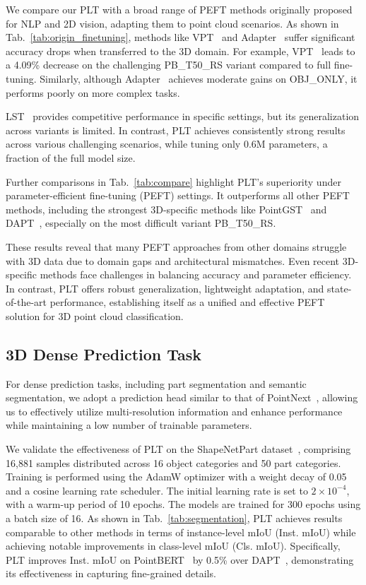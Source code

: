 We compare our PLT with a broad range of PEFT methods originally proposed for NLP and 2D vision, adapting them to point cloud scenarios. As shown in Tab.~\ref{tab:origin_finetuning}, methods like VPT~\cite{jia2022visual} and Adapter~\cite{houlsby2019parameter} suffer significant accuracy drops when transferred to the 3D domain. For example, VPT~\cite{jia2022visual} leads to a 4.09\% decrease on the challenging PB\_T50\_RS variant compared to full fine-tuning. Similarly, although Adapter~\cite{houlsby2019parameter} achieves moderate gains on OBJ\_ONLY, it performs poorly on more complex tasks.

LST~\cite{sung2022lst} provides competitive performance in specific settings, but its generalization across variants is limited. In contrast, PLT achieves consistently strong results across various challenging scenarios, while tuning only 0.6M parameters, a fraction of the full model size.

Further comparisons in Tab.~\ref{tab:compare} highlight PLT’s superiority under parameter-efficient fine-tuning (PEFT) settings. It outperforms all other PEFT methods, including the strongest 3D-specific methods like PointGST~\cite{liang2024parameter} and DAPT~\cite{zhou2024dynamic}, especially on the most difficult variant PB\_T50\_RS.

These results reveal that many PEFT approaches from other domains struggle with 3D data due to domain gaps and architectural mismatches. Even recent 3D-specific methods face challenges in balancing accuracy and parameter efficiency. In contrast, PLT offers robust generalization, lightweight adaptation, and state-of-the-art performance, establishing itself as a unified and effective PEFT solution for 3D point cloud classification.





\subsection{3D Dense Prediction Task}
For dense prediction tasks, including part segmentation and semantic segmentation, we adopt a prediction head similar to that of PointNext~\cite{qian2022pointnext}, allowing us to effectively utilize multi-resolution information and enhance performance while maintaining a low number of trainable parameters.

We validate the effectiveness of PLT on the ShapeNetPart dataset~\cite{yi2016scalable}, comprising 16,881 samples distributed across 16 object categories and 50 part categories. Training is performed using the AdamW optimizer with a weight decay of 0.05 and a cosine learning rate scheduler. The initial learning rate is set to $2 \times 10^{-4}$, with a warm-up period of 10 epochs. The models are trained for 300 epochs using a batch size of 16. As shown in Tab.~\ref{tab:segmentation}, PLT achieves results comparable to other methods in terms of instance-level mIoU (Inst. mIoU) while achieving notable improvements in class-level mIoU (Cls. mIoU). Specifically, PLT improves Inst. mIoU on PointBERT~\cite{yu2022point} by 0.5\% over DAPT~\cite{zhou2024dynamic}, demonstrating its effectiveness in capturing fine-grained details.

